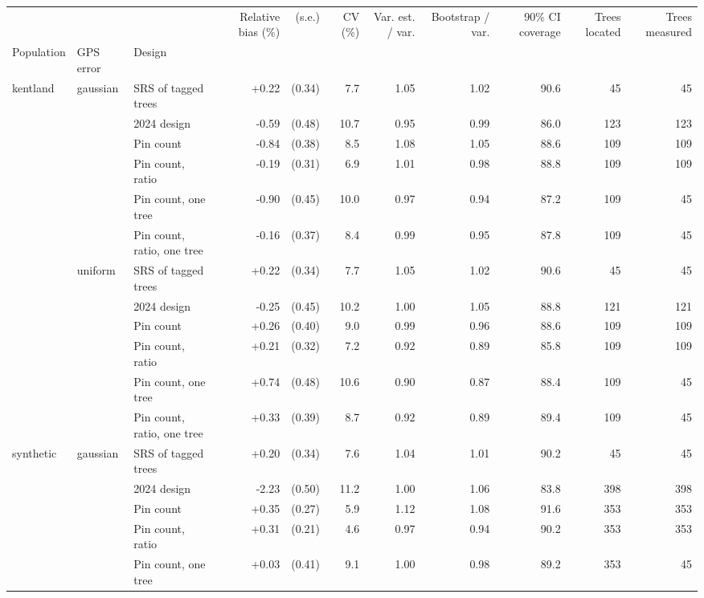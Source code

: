 \begin{tabular}{lll|rr|r|rr|r|rr}
\toprule
 &  &  & Relative bias (\%) & (s.e.) & CV (\%) & Var. est. / var. & Bootstrap / var. & 90\% CI coverage & Trees located & Trees measured \\
Population & GPS error & Design &  &  &  &  &  &  &  &  \\
\midrule
\multirow[t]{12}{*}{kentland} & \multirow[t]{6}{*}{gaussian} & SRS of tagged trees & +0.22 & (0.34) & 7.7 & 1.05 & 1.02 & 90.6 & 45 & 45 \\
 &  & 2024 design & -0.59 & (0.48) & 10.7 & 0.95 & 0.99 & 86.0 & 123 & 123 \\
 &  & Pin count & -0.84 & (0.38) & 8.5 & 1.08 & 1.05 & 88.6 & 109 & 109 \\
 &  & Pin count, ratio & -0.19 & (0.31) & 6.9 & 1.01 & 0.98 & 88.8 & 109 & 109 \\
 &  & Pin count, one tree & -0.90 & (0.45) & 10.0 & 0.97 & 0.94 & 87.2 & 109 & 45 \\
 &  & Pin count, ratio, one tree & -0.16 & (0.37) & 8.4 & 0.99 & 0.95 & 87.8 & 109 & 45 \\
\cline{2-11}
 & \multirow[t]{6}{*}{uniform} & SRS of tagged trees & +0.22 & (0.34) & 7.7 & 1.05 & 1.02 & 90.6 & 45 & 45 \\
 &  & 2024 design & -0.25 & (0.45) & 10.2 & 1.00 & 1.05 & 88.8 & 121 & 121 \\
 &  & Pin count & +0.26 & (0.40) & 9.0 & 0.99 & 0.96 & 88.6 & 109 & 109 \\
 &  & Pin count, ratio & +0.21 & (0.32) & 7.2 & 0.92 & 0.89 & 85.8 & 109 & 109 \\
 &  & Pin count, one tree & +0.74 & (0.48) & 10.6 & 0.90 & 0.87 & 88.4 & 109 & 45 \\
 &  & Pin count, ratio, one tree & +0.33 & (0.39) & 8.7 & 0.92 & 0.89 & 89.4 & 109 & 45 \\
\cline{1-11} \cline{2-11}
\multirow[t]{12}{*}{synthetic} & \multirow[t]{6}{*}{gaussian} & SRS of tagged trees & +0.20 & (0.34) & 7.6 & 1.04 & 1.01 & 90.2 & 45 & 45 \\
 &  & 2024 design & -2.23 & (0.50) & 11.2 & 1.00 & 1.06 & 83.8 & 398 & 398 \\
 &  & Pin count & +0.35 & (0.27) & 5.9 & 1.12 & 1.08 & 91.6 & 353 & 353 \\
 &  & Pin count, ratio & +0.31 & (0.21) & 4.6 & 0.97 & 0.94 & 90.2 & 353 & 353 \\
 &  & Pin count, one tree & +0.03 & (0.41) & 9.1 & 1.00 & 0.98 & 89.2 & 353 & 45 \\

\end{tabular}
